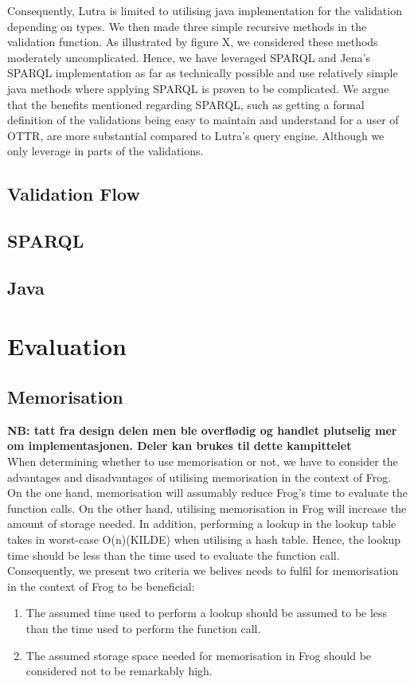 \para
Consequently, Lutra is limited to utilising java implementation for the validation depending on types. We then made three simple recursive methods in the validation function. As illustrated by figure X, we considered these methods moderately uncomplicated. Hence, we have leveraged SPARQL and Jena's SPARQL implementation as far as technically possible and use relatively simple java methods where applying SPARQL is proven to be complicated. We argue that the benefits mentioned regarding SPARQL, such as getting a formal definition of the validations being easy to maintain and understand for a user of OTTR, are more substantial compared to Lutra's query engine. Although we only leverage in parts of the validations. 

\subsection{Validation Flow}

\subsection{SPARQL}

\subsection{Java}

\section{Evaluation}
\label{implementation_evaluation}

\subsection{Memorisation}
\textbf{NB: tatt fra design delen men ble overflødig og handlet plutselig mer om implementasjonen. Deler kan brukes til dette kampittelet}
\\
When determining whether to use memorisation or not, we have to consider the advantages and disadvantages of utilising memorisation in the context of Frog. On the one hand, memorisation will assumably reduce Frog's time to evaluate the function calls. On the other hand, utilising memorisation in Frog will increase the amount of storage needed. In addition, performing a lookup in the lookup table takes in worst-case O(n)(KILDE) when utilising a hash table. Hence, the lookup time should be less than the time used to evaluate the function call. Consequently, we present two criteria we belives needs to fulfil for memorisation in the context of Frog to be beneficial:
\begin{enumerate}
    \item The assumed time used to perform a lookup should be assumed to be less than the time used to perform the function call.
    \item The assumed storage space needed for memorisation in Frog should be considered not to be remarkably high. 
\end{enumerate}

